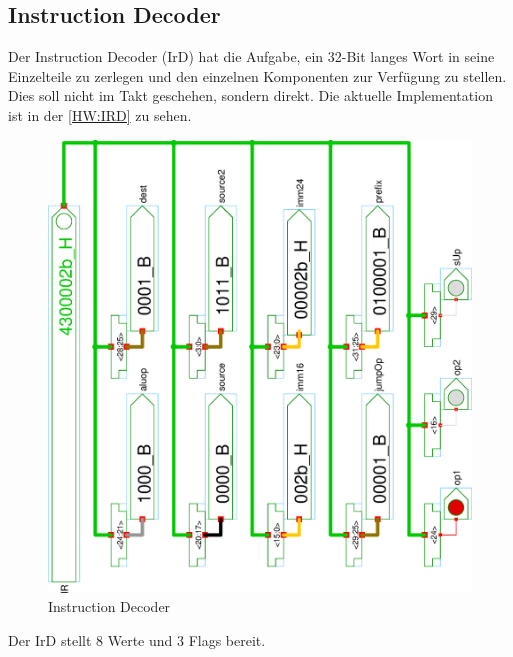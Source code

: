 \subsection{Instruction Decoder}
Der Instruction Decoder (IrD) hat die Aufgabe, ein 32-Bit langes Wort in seine Einzelteile zu zerlegen und den einzelnen Komponenten zur Verfügung zu stellen. Dies soll nicht im Takt geschehen, sondern direkt. Die aktuelle Implementation ist in der \autoref{HW:IRD} zu sehen.\\
\begin{figure}[!ht]
\centering
\hspace{-5em}
\includegraphics[width=1\textwidth,angle=270]{images/ir.eps}
\caption{\label{HW:IRD}Instruction Decoder}
\end{figure}%
Der IrD stellt 8 Werte und 3 Flags bereit.

